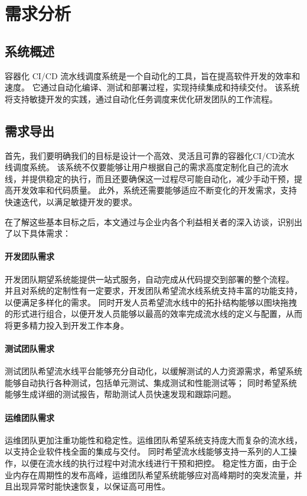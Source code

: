 
\chapter{需求分析}

\section{系统概述}
容器化 CI/CD 流水线调度系统是一个自动化的工具，旨在提高软件开发的效率和速度。
它通过自动化编译、测试和部署过程，实现持续集成和持续交付。
该系统将支持敏捷开发的实践，通过自动化任务调度来优化研发团队的工作流程。
\section{需求导出}

首先，我们要明确我们的目标是设计一个高效、灵活且可靠的容器化CI/CD流水线调度系统。
该系统不仅要能够让用户根据自己的需求高度定制化自己的流水线，并提供稳定的执行，而且还要确保这一过程尽可能自动化，减少手动干预，提高开发效率和代码质量。
此外，系统还需要能够适应不断变化的开发需求，支持快速迭代，以满足敏捷开发的要求。

在了解这些基本目标之后，本文通过与企业内各个利益相关者的深入访谈，识别出了以下具体需求：

\subsubsection{开发团队需求}
开发团队期望系统能提供一站式服务，自动完成从代码提交到部署的整个流程。
并且对系统的定制性有一定要求，开发团队希望流水线系统支持丰富的功能支持，以便满足多样化的需求。
同时开发人员希望流水线中的拓扑结构能够以图块拖拽的形式进行组合，以便开发人员能够以最高的效率完成流水线的定义与配置，从而将更多精力投入到开发工作本身。

\subsubsection{测试团队需求}
测试团队希望流水线平台能够充分自动化，以缓解测试的人力资源需求，希望系统能够自动执行各种测试，包括单元测试、集成测试和性能测试等；
同时希望系统能够生成详细的测试报告，帮助测试人员快速发现和跟踪问题。

\subsubsection{运维团队需求}
运维团队更加注重功能性和稳定性。运维团队希望系统支持庞大而复杂的流水线，以支持企业软件栈全面的集成与交付。
同时希望流水线能够支持一系列的人工操作，以便在流水线的执行过程中对流水线进行干预和把控。
稳定性方面，由于企业内存在周期性的发布高峰，运维团队希望系统能够应对高峰期时的突发流量，并且出现异常时能快速恢复，以保证高可用性。


